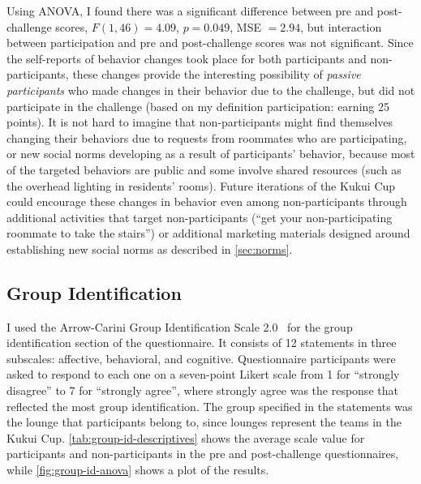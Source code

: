 Using ANOVA, I found there was a significant difference between pre and post-challenge scores, \(F(1, 46) = 4.09\), \(p = 0.049\), MSE \(= 2.94\), but interaction between participation and pre and post-challenge scores was not significant. Since the self-reports of behavior changes took place for both participants and non-participants, these changes provide the interesting possibility of \emph{passive participants} who made changes in their behavior due to the challenge, but did not participate in the challenge (based on my definition participation: earning 25 points). It is not hard to imagine that non-participants might find themselves changing their behaviors due to requests from roommates who are participating, or new social norms developing as a result of participants' behavior, because most of the targeted behaviors are public and some involve shared resources (such as the overhead lighting in residents' rooms). Future iterations of the Kukui Cup could encourage these changes in behavior even among non-participants through additional activities that target non-participants (``get your non-participating roommate to take the stairs'') or additional marketing materials designed around establishing new social norms as described in \autoref{sec:norms}.


\subsection{Group Identification}
\label{sec:group-id}

I used the Arrow-Carini Group Identification Scale 2.0~\cite{Henry1999} for the group identification section of the questionnaire. It consists of 12 statements in three subscales: affective, behavioral, and cognitive. Questionnaire participants were asked to respond to each one on a seven-point Likert scale from 1 for ``strongly disagree'' to 7 for ``strongly agree'', where strongly agree was the response that reflected the most group identification. The group specified in the statements was the lounge that participants belong to, since lounges represent the teams in the Kukui Cup. \autoref{tab:group-id-descriptives} shows the average scale value for participants and non-participants in the pre and post-challenge questionnaires, while \autoref{fig:group-id-anova} shows a plot of the results.

